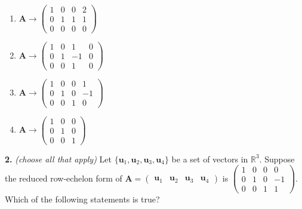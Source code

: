 \documentclass[10pt,a4paper]{article}
\begin{document}
\begin{enumerate}[label=(\Alph*)]
\item \(\mathbf{A}\rightarrow\begin{pmatrix}1&0&0&2\\0&1&1&1\\0&0&0&0\end{pmatrix}\)
\item \(\mathbf{A}\rightarrow\begin{pmatrix}1&0&1&0\\0&1&-1&0\\0&0&1&0\end{pmatrix}\)
\item \(\mathbf{A}\rightarrow\begin{pmatrix}1&0&0&1\\0&1&0&-1\\0&0&1&0\end{pmatrix}\)
\item \(\mathbf{A}\rightarrow\begin{pmatrix}1&0&0\\0&1&0\\0&0&1\end{pmatrix}\)
\end{enumerate}
\smallskip
\textbf{2.} \textit{(choose all that apply)} Let \(\{\mathbf{u}_1,\mathbf{u}_2,\mathbf{u}_3,\mathbf{u}_4\}\) be a set of vectors in \(\mathbb{R}^3\). Suppose the reduced row-echelon form of \(\mathbf{A}=\begin{pmatrix}\mathbf{u}_1&\mathbf{u}_2&\mathbf{u}_3&\mathbf{u}_4\end{pmatrix}\) is \(\begin{pmatrix}1&0&0&0\\0&1&0&-1\\0&0&1&1\end{pmatrix}\). Which of the following statements is true?
\end{document}
